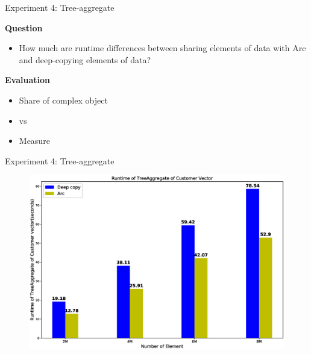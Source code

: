 \documentclass[9pt]{beamer}
\begin{document}

\begin{frame}[fragile]{Experiment 4: Tree-aggregate}

    \textbf{Question}
    \begin{itemize}
        \item How much are runtime differences between sharing elements of data with Arc and deep-copying elements of data?
    \end{itemize}

    \vspace{0.5cm}

    \textbf{Evaluation}
    \begin{itemize}
        \item Share  of complex object
        \item {} vs 
        \item Measure 
    \end{itemize}

\end{frame}


\begin{frame}[t, fragile]{Experiment 4: Tree-aggregate}
    \vspace{-0.7cm}
    \begin{figure}[hp]
        \centering
        \begin{center}
                \includegraphics[width=1.1\textwidth]{images/rust_tree_aggregate.eps}
                \captionsetup{labelformat=empty}
        \end{center}
    \end{figure}
\end{frame}
\end{document}
